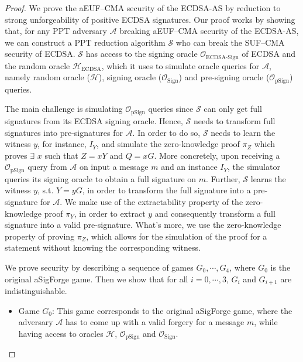 \documentclass{llncs}
\begin{document}
\begin{proof}
We prove the aEUF–CMA security of the ECDSA-AS by reduction to strong unforgeability of positive ECDSA signatures. Our proof works by showing that, for any PPT adversary $\mathcal{A}$ breaking aEUF–CMA security of the ECDSA-AS, we can construct a PPT reduction algorithm $\mathcal{S}$ who can break the SUF–CMA security of ECDSA. $\mathcal{S}$ has access to the signing oracle $\mathcal{O}_{\text{ECDSA-Sign}}$ of ECDSA and the random oracle $\mathcal{H}_{\text{ECDSA}}$, which it uses to simulate oracle queries for $\mathcal{A}$, namely random oracle ($\mathcal{H}$), signing oracle ($\mathcal{O}_{\text{Sign}}$) and pre-signing oracle ($\mathcal{O}_{\text{pSign}}$) queries.

The main challenge is simulating $\mathcal{O}_{\text{pSign}}$ queries since $\mathcal{S}$ can only get full signatures from its ECDSA signing oracle. Hence, $\mathcal{S}$ needs to transform full signatures into pre-signatures for $\mathcal{A}$. In order to do so, $\mathcal{S}$ needs to learn the witness $y$, for instance, $I_Y$, and simulate the zero-knowledge proof $\pi_Z$ which proves $\exists$ $x$ such that $Z=xY$ and $Q=xG$. More concretely, upon receiving a $\mathcal{O}_{\text{pSign}}$ query from $\mathcal{A}$ on input a message $m$ and an instance $I_Y$, the simulator queries its signing oracle to obtain a full signature on $m$.  
Further, $\mathcal{S}$ learns the witness $y$, s.t. $Y = yG$, in order to transform the full signature into a pre-signature for $\mathcal{A}$. We make use of the extractability property of the zero-knowledge proof $\pi_Y$, in order to extract $y$ and consequently transform a full signature into a valid pre-signature. What's more, we use the zero-knowledge property of proving $\pi_Z$, which allows for the simulation of the proof for a statement without knowing the corresponding witness.  

We prove security by describing a sequence of games $G_0,\cdots,G_4$, where $G_0$ is the original aSigForge game. Then we show that for all $i = 0,\cdots,3$, $G_i$ and $G_{i+1}$ are indistinguishable.

\begin{itemize}
\item Game $G_0$: This game corresponds to the original aSigForge game, where the adversary $\mathcal{A}$ has to come up with a valid forgery for a message $m$, while having access to oracles $\mathcal{H}$, $\mathcal{O}_{\text{pSign}}$ and $\mathcal{O}_{\text{Sign}}$.


\end{itemize}
\end{proof}
\end{document}
